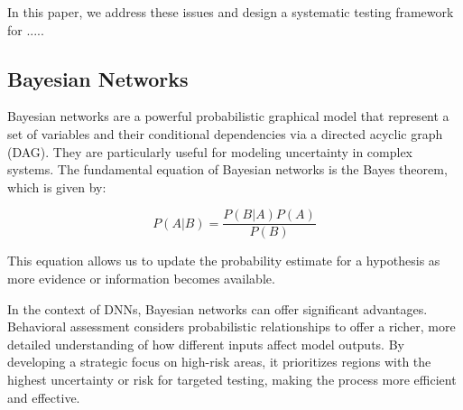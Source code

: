 \documentclass[10pt, conference, a4paper, final]{IEEEtran}
\begin{document}
In this paper, we address these issues and design a systematic testing framework for .....

\subsection{Bayesian Networks}


Bayesian networks are a powerful probabilistic graphical model that represent a set of variables and their conditional dependencies via a directed acyclic graph (DAG). They are particularly useful for modeling uncertainty in complex systems. The fundamental equation of Bayesian networks is the Bayes theorem, which is given by:

\begin{equation}
P(A|B) = \frac{P(B|A)P(A)}{P(B)}
\end{equation}

This equation allows us to update the probability estimate for a hypothesis as more evidence or information becomes available.

In the context of DNNs, Bayesian networks can offer significant advantages. Behavioral assessment considers probabilistic relationships to offer a richer, more detailed understanding of how different inputs affect model outputs. By developing a strategic focus on high-risk areas, it prioritizes regions with the highest uncertainty or risk for targeted testing, making the process more efficient and effective. 
\end{document}
